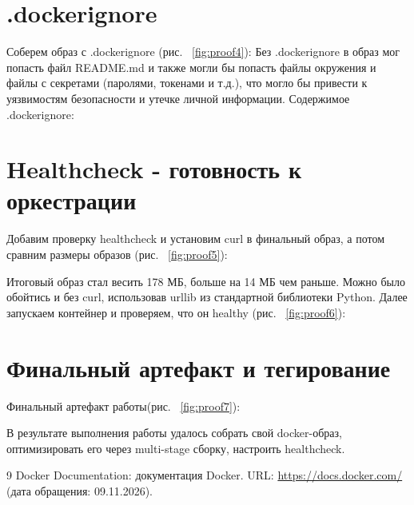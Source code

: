 \chapter{.dockerignore}

Соберем образ с .dockerignore (рис. ~\ref{fig:proof4}):
Без .dockerignore в образ мог попасть файл README.md и также могли бы попасть файлы окружения и файлы с секретами (паролями, токенами и т.д.), что могло бы привести к уязвимостям безопасности и утечке личной информации. Содержимое .dockerignore:


\chapter{Healthcheck - готовность к оркестрации}

Добавим проверку healthcheck и установим curl в финальный образ, а потом сравним размеры образов (рис. ~\ref{fig:proof5}):

Итоговый образ стал весить 178 МБ, больше на 14 МБ чем раньше. Можно было обойтись и без curl, использовав urllib из стандартной библиотеки Python. 
Далее запускаем контейнер и проверяем, что он healthy (рис. ~\ref{fig:proof6}):



\chapter{Финальный артефакт и тегирование}

Финальный артефакт работы(рис. ~\ref{fig:proof7}):









В результате выполнения работы удалось собрать свой docker-образ, оптимизировать его через multi-stage сборку, настроить healthcheck. 

\begin{thebibliography}{9}
  Docker Documentation: документация Docker.
  URL: \url{https://docs.docker.com/}
  (дата обращения: 09.11.2026).
\end{thebibliography}


